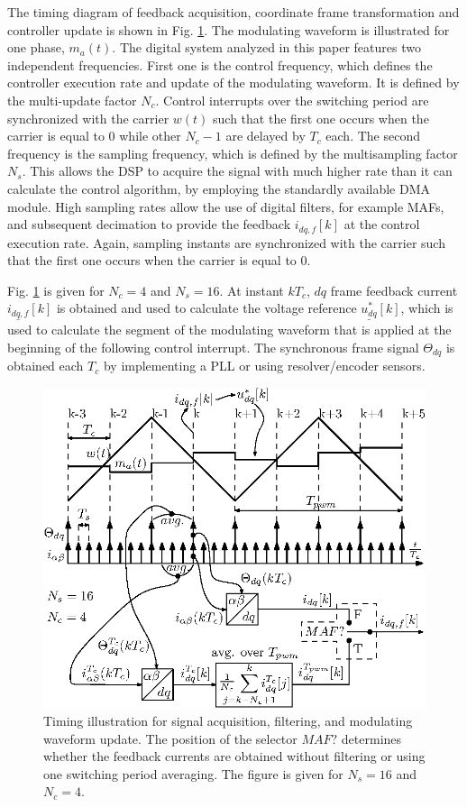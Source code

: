 \documentclass[conference]{IEEEtran}
\begin{document}
The timing diagram of feedback acquisition, coordinate frame transformation and controller update is shown in Fig. \ref{fig:timings}. The modulating waveform is illustrated for one phase, $m_a(t)$.
The digital system analyzed in this paper features two independent frequencies. First one is the control frequency, which defines the controller execution rate and update of the modulating waveform. It is defined by the multi-update factor $N_c$. Control interrupts over the switching period are synchronized with the carrier $w(t)$ such that the first one occurs when the carrier is equal to $0$ while other $N_c-1$ are delayed by $T_c$ each. 
The second frequency is the sampling frequency, which is defined by the multisampling factor $N_s$. This allows the DSP to acquire the signal with much higher rate than it can calculate the control algorithm, by employing the standardly available DMA module. High sampling rates allow the use of digital filters, for example MAFs, and subsequent decimation to provide the feedback $i_{dq,f}[k]$ at the control execution rate.
Again, sampling instants are synchronized with the carrier such that the first one occurs when the carrier is equal to $0$. 

Fig. \ref{fig:timings} is given for $N_c = 4$ and $N_s = 16$. At instant $kT_c$, $dq$ frame feedback current $\underline{i_{dq,f}}[k]$ is obtained and used to calculate the voltage reference $\underline{u^*_{dq}}[k]$, which is used to calculate the segment of the modulating waveform that is applied at the beginning of the following control interrupt. The synchronous frame signal $\Theta_{dq}$ is obtained each $T_c$ by implementing a PLL or using resolver/encoder sensors. 

\begin{figure}[t!]
    \centerline{\includegraphics[width=0.95\linewidth]{figures/timing_diagram.eps}}
    \caption{Timing illustration for signal acquisition, filtering, and modulating waveform update. The position of the selector $MAF?$ determines whether the feedback currents are obtained without filtering or using one switching period averaging. The figure is given for $N_s = 16$ and $N_c = 4$.}
    \label{fig:timings}
\end{figure}
\end{document}
